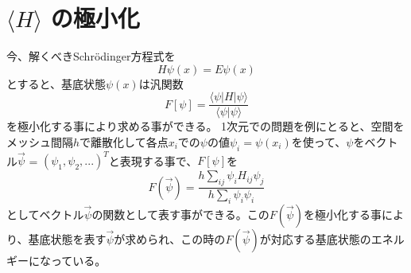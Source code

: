 \documentclass[a4j,twocolumn]{jarticle}
\begin{document}
\section{$\langle H \rangle$ の極小化}
今、解くべきSchr\"odinger方程式を
\begin{displaymath}
H\psi(x) = E\psi(x)
\end{displaymath}
とすると、基底状態$\psi(x)$は汎関数
\begin{displaymath}
F[\psi] = \frac{\langle\psi|H|\psi\rangle}{\langle\psi|\psi\rangle}
\end{displaymath}
を極小化する事により求める事ができる。
1次元での問題を例にとると、空間をメッシュ間隔$h$で離散化して各点$x_i$での$\psi$の値$\psi_i=\psi(x_i)$を使って、$\psi$をベクトル$\vec{\psi}$ = $(\psi_1, \psi_2, ...)^T$と表現する事で、$F[\psi]$を
\begin{displaymath}
F(\vec{\psi}) = \frac{h\sum_{ij}\psi_i H_{ij} \psi_j}{h\sum_{i}\psi_i\psi_i}
\end{displaymath}
としてベクトル$\vec{\psi}$の関数として表す事ができる。この$F(\vec{\psi})$を極小化する事により、基底状態を表す$\vec{\psi}$が求められ、この時の$F(\vec{\psi})$が対応する基底状態のエネルギーになっている。

\vspace{-5mm}
\end{document}
